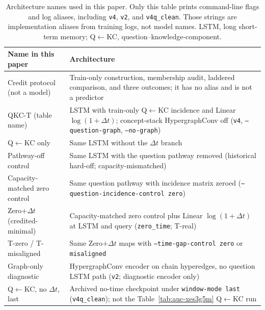 \begin{table}[tbp]
\caption{Architecture names used in this paper. Only this table prints
command-line flags and log aliases, including \texttt{v4}, \texttt{v2},
and \texttt{v4q\_clean}. Those strings are implementation aliases from
training logs, not model names. LSTM, long short-term memory;
Q$\leftarrow$KC, question--knowledge-component.}
\label{tab:aliases}
\centering
\footnotesize
\begingroup
\renewcommand{\arraystretch}{0.95}
\begin{tabular}{@{}p{4.35cm}p{8.0cm}@{}}
\toprule
Name in this paper & Architecture \\
\midrule
Credit protocol (not a model) & Train-only construction, membership
audit, laddered comparison, and three outcomes; it has no alias and is
not a predictor \\
QKC-T (table name) & LSTM with train-only Q$\leftarrow$KC
incidence and Linear $\log(1{+}\Delta t)$; concept-stack HypergraphConv
off (\texttt{v4}, \texttt{--question-graph}, \texttt{--no-graph}) \\
Q$\leftarrow$KC only & Same LSTM without the $\Delta t$ branch \\
Pathway-off control & Same LSTM with the question pathway removed
(historical hard-off; capacity-mismatched) \\
Capacity-matched zero control & Same question pathway with incidence matrix
zeroed (\texttt{--question-incidence-control zero}) \\
Zero$+\Delta t$ (credited-minimal) & Capacity-matched zero control plus Linear
$\log(1{+}\Delta t)$ at LSTM and query (\texttt{zero\_time}; T-real) \\
T-zero / T-misaligned & Same Zero$+\Delta t$ maps with
\texttt{--time-gap-control zero} or \texttt{misaligned} \\
Graph-only diagnostic & HypergraphConv encoder on chain hyperedges, no
question LSTM path (\texttt{v2}; diagnostic encoder only) \\
Q$\leftarrow$KC, no $\Delta t$, last & Archived no-time checkpoint
under \texttt{window-mode last} (\texttt{v4q\_clean}); not the
Table~\ref{tab:auc-xes3g5m} Q$\leftarrow$KC run \\
\bottomrule
\end{tabular}
\endgroup
\end{table}
